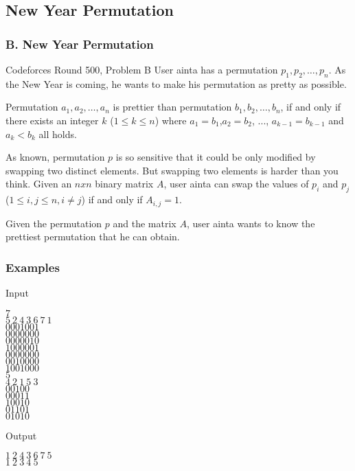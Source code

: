 \documentclass{beamer}
\begin{document}
\subsection{New Year Permutation}
\begin{frame}
\frametitle{B. New Year Permutation}

\begin{block}{Codeforces Round 500, Problem B}
User ainta has a permutation $p_1, p_2, \dots, p_n$. As the New Year is coming, he wants to make his permutation as pretty as possible.

Permutation $a_1, a_2,  \dots, a_n$ is prettier than permutation $b_1, b_2, \dots, b_n$, if and only if there exists an integer $k$ ($1 \le k \le n$) where $a_1=b_1$,$a_2=b_2$, ..., $a_{k-1}=b_{k-1}$ and $a_k < b_k$ all holds.

As known, permutation $p$ is so sensitive that it could be only modified by swapping two distinct elements. But swapping two elements is harder than you think. Given an $nxn$ binary matrix $A$, user ainta can swap the values of $p_i$ and $p_j$ ($1 \le i,j \le n, i \ne j$) if and only if $A_{i,j}=1$.

Given the permutation $p$ and the matrix $A$, user ainta wants to know the prettiest permutation that he can obtain.
\end{block}

\end{frame}
\begin{frame}
\frametitle{Examples}

\begin{block}{Input}
\begin{multicols}{2}
$7$\\
$5\ 2\ 4\ 3\ 6\ 7\ 1$\\
$0001001$\\
$0000000$\\
$0000010$\\
$1000001$\\
$0000000$\\
$0010000$\\
$1001000$\\
$5$\\
$4\ 2\ 1\ 5\ 3$\\
$00100$\\
$00011$\\
$10010$\\
$01101$\\
$01010$
\newline
\\
\end{multicols}
\end{block}

\begin{block}{Output}
\begin{multicols}{2}
$1\ 2\ 4\ 3\ 6\ 7\ 5$ \\
$1\ 2\ 3\ 4\ 5$
\end{multicols}

\end{block}

\end{frame}
\end{document}

